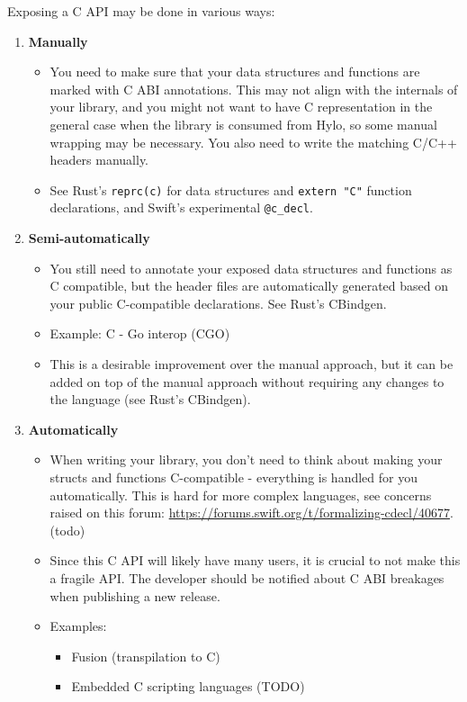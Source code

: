 Exposing a C API may be done in various ways:
\begin{enumerate}[label=(\alph*)]
\item \textbf{Manually}
  \begin{itemize}
  \item You need to make sure that your data structures and functions are marked with C ABI annotations. This may not align with the internals of your library, and you might not want to have C representation in the general case when the library is consumed from Hylo, so some manual wrapping may be necessary. You also need to write the matching C/C++ headers manually.
  \item See Rust's \texttt{reprc(c)} for data structures and \texttt{extern "C"} function declarations, and Swift's experimental \texttt{@c\_decl}.
  \end{itemize}
\item \textbf{Semi-automatically}
  \begin{itemize}
  \item You still need to annotate your exposed data structures and functions as C compatible, but the header files are automatically generated based on your public C-compatible declarations. See Rust's CBindgen.
  \item Example: C - Go interop (CGO)
  \item This is a desirable improvement over the manual approach, but it can be added on top of the manual approach without requiring any changes to the language (see Rust's CBindgen). %
  \end{itemize}
\item \textbf{Automatically}
  \begin{itemize}
  \item When writing your library, you don't need to think about making your structs and functions C-compatible - everything is handled for you automatically. This is hard for more complex languages, see concerns raised on this forum: \url{https://forums.swift.org/t/formalizing-cdecl/40677}. (todo)
  \item Since this C API will likely have many users, it is crucial to not make this a fragile API. The developer should be notified about C ABI breakages when publishing a new release.
  \item Examples:
    \begin{itemize}
    \item Fusion (transpilation to C)
    \item Embedded C scripting languages (TODO)
    \end{itemize}
  \end{itemize}
\end{enumerate}


